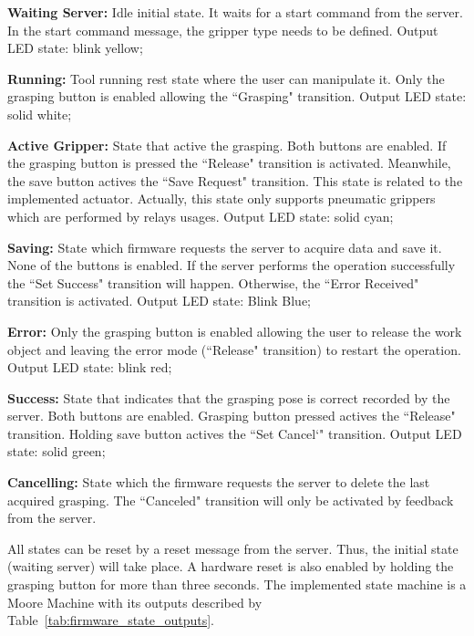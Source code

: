 \begin{itemize_jp}
    \item \textbf{Waiting Server:} Idle initial state. It waits for a start command from the server. In the start command message, the gripper type needs to be defined. Output LED state: blink yellow;

    \item \textbf{Running:} Tool running rest state where the user can manipulate it. Only the grasping button is enabled allowing the ``Grasping" transition. Output LED state: solid white;
    
    \item \textbf{Active Gripper:} State that active the grasping. Both buttons are enabled. If the grasping button is pressed the ``Release" transition is activated. Meanwhile, the save button actives the ``Save Request" transition. This state is related to the implemented actuator. Actually, this state only supports pneumatic grippers which are performed by relays usages.  Output LED state: solid cyan;
    
    \item \textbf{Saving: } State which firmware requests the server to acquire data and save it. None of the buttons is enabled. If the server performs the operation successfully the ``Set Success" transition will happen. Otherwise, the ``Error Received" transition is activated. Output LED state: Blink Blue;
    
    \item \textbf{Error:} Only the grasping button is enabled allowing the user to release the work object and leaving the error mode (``Release" transition) to restart the operation. Output LED state: blink red;
    
    \item \textbf{Success:} State that indicates that the grasping pose is correct recorded by the server. Both buttons are enabled. Grasping button pressed actives the ``Release" transition. Holding save button actives the ``Set Cancel`" transition. Output LED state: solid green;
    
    \item \textbf{Cancelling:} State which the firmware requests the server to delete the last acquired grasping. The ``Canceled" transition will only be activated by feedback from the server. 
    
\end{itemize_jp}

All states can be reset by a reset message from the server. Thus, the initial state (waiting server) will take place. A hardware reset is also enabled by holding the grasping button for more than three seconds. The implemented state machine is a Moore Machine with its outputs described by Table~\ref{tab:firmware_state_outputs}.

